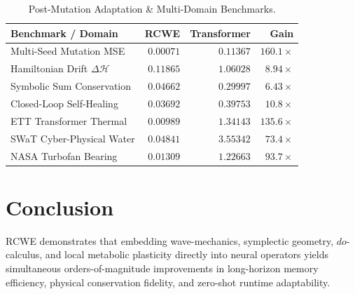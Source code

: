 \documentclass[11pt,twocolumn]{article}
\begin{document}
\begin{table}[h]
\centering
\caption{Post-Mutation Adaptation \& Multi-Domain Benchmarks.}
\vspace{4pt}
\footnotesize
\begin{tabular}{@{}lrrr@{}}
\toprule
\textbf{Benchmark / Domain} & \textbf{RCWE} & \textbf{Transformer} & \textbf{Gain} \\
\midrule
Multi-Seed Mutation MSE     & $\mathbf{0.00071}$ & $0.11367$ & $\mathbf{160.1\times}$ \\
Hamiltonian Drift $\Delta\mathcal{H}$ & $\mathbf{0.11865}$ & $1.06028$ & $\mathbf{8.94\times}$ \\
Symbolic Sum Conservation   & $\mathbf{0.04662}$ & $0.29997$ & $\mathbf{6.43\times}$ \\
Closed-Loop Self-Healing    & $\mathbf{0.03692}$ & $0.39753$ & $\mathbf{10.8\times}$ \\
ETT Transformer Thermal     & $\mathbf{0.00989}$ & $1.34143$ & $\mathbf{135.6\times}$ \\
SWaT Cyber-Physical Water   & $\mathbf{0.04841}$ & $3.55342$ & $\mathbf{73.4\times}$ \\
NASA Turbofan Bearing       & $\mathbf{0.01309}$ & $1.22663$ & $\mathbf{93.7\times}$ \\
\bottomrule
\end{tabular}
\end{table}

\section{Conclusion}
RCWE demonstrates that embedding wave-mechanics, symplectic geometry, $do$-calculus, and local metabolic plasticity directly into neural operators yields simultaneous orders-of-magnitude improvements in long-horizon memory efficiency, physical conservation fidelity, and zero-shot runtime adaptability.
\end{document}
